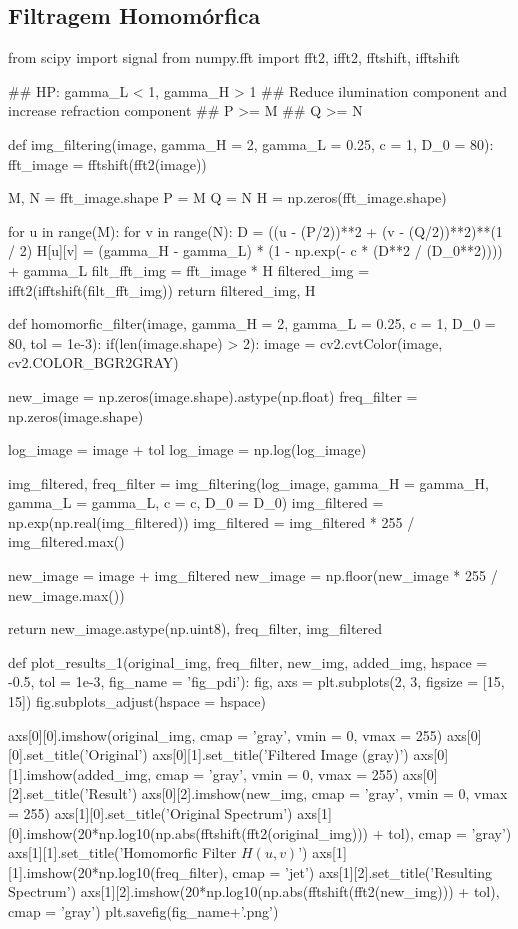 \documentclass{article}
\begin{document}
\subsection{Filtragem Homomórfica}
\label{cod:homomorfic}
\begin{python}
from scipy import signal
from numpy.fft import fft2, ifft2, fftshift, ifftshift

## HP: gamma_L < 1, gamma_H > 1
## Reduce ilumination component and increase refraction component
## P >= M
## Q >= N

def img_filtering(image, gamma_H = 2, gamma_L = 0.25, c = 1, D_0 = 80):
	fft_image = fftshift(fft2(image))
	
	M, N = fft_image.shape
	P = M
	Q = N
	H = np.zeros(fft_image.shape)
	
	for u in range(M):
		for v in range(N):
			D = ((u - (P/2))**2 + (v - (Q/2))**2)**(1 / 2)
			H[u][v] = (gamma_H - gamma_L) * (1 - np.exp(- c * (D**2 / (D_0**2)))) + gamma_L
	filt_fft_img = fft_image * H
	filtered_img = ifft2(ifftshift(filt_fft_img))
	return filtered_img, H
	
def homomorfic_filter(image, gamma_H = 2, gamma_L = 0.25, c = 1, D_0 = 80, tol = 1e-3):
	if(len(image.shape) > 2):
		image = cv2.cvtColor(image, cv2.COLOR_BGR2GRAY)
	
	new_image = np.zeros(image.shape).astype(np.float)
	freq_filter = np.zeros(image.shape)
	
	log_image = image + tol
	log_image = np.log(log_image)    
	
	img_filtered, freq_filter = img_filtering(log_image, gamma_H = gamma_H,  
																						gamma_L = gamma_L, c = c, D_0 = D_0)
	img_filtered = np.exp(np.real(img_filtered))
	img_filtered = img_filtered * 255 / img_filtered.max()
	
	new_image = image + img_filtered
	new_image = np.floor(new_image * 255 / new_image.max())

	return new_image.astype(np.uint8), freq_filter, img_filtered


def plot_results_1(original_img, freq_filter, new_img, added_img, hspace = -0.5, tol = 1e-3, fig_name = 'fig_pdi'):
	fig, axs = plt.subplots(2, 3, figsize = [15, 15])
	fig.subplots_adjust(hspace = hspace)
	
	axs[0][0].imshow(original_img, cmap = 'gray', vmin = 0, vmax = 255)
	axs[0][0].set_title('Original')
	axs[0][1].set_title('Filtered Image (gray)')
	axs[0][1].imshow(added_img, cmap = 'gray', vmin = 0, vmax = 255)
	axs[0][2].set_title('Result')
	axs[0][2].imshow(new_img, cmap = 'gray', vmin = 0, vmax = 255)
	axs[1][0].set_title('Original Spectrum')
	axs[1][0].imshow(20*np.log10(np.abs(fftshift(fft2(original_img))) + tol), cmap = 'gray')
	axs[1][1].set_title('Homomorfic Filter $H(u, v)$')
	axs[1][1].imshow(20*np.log10(freq_filter), cmap = 'jet')
	axs[1][2].set_title('Resulting Spectrum')
	axs[1][2].imshow(20*np.log10(np.abs(fftshift(fft2(new_img))) + tol), cmap = 'gray')
	plt.savefig(fig_name+'.png')
\end{python}
\end{document}
